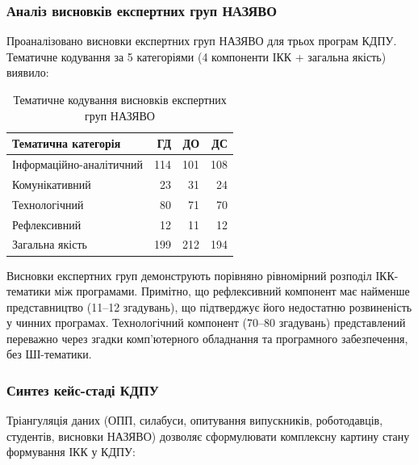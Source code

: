 \subsubsection{Аналіз висновків експертних груп НАЗЯВО}\label{sssec:2.2.6}

Проаналізовано висновки експертних груп НАЗЯВО для трьох програм КДПУ. Тематичне кодування за 5 категоріями (4 компоненти ІКК + загальна якість) виявило:

\begin{table}[htbp]
\centering
\caption{Тематичне кодування висновків експертних груп НАЗЯВО}\label{tab:expert-coding}
\small
\begin{tabularx}{\textwidth}{@{}Xrrr@{}}
\toprule
\textbf{Тематична категорія} & \textbf{ГД} & \textbf{ДО} & \textbf{ДС} \\
\midrule
Інформаційно-аналітичний & 114 & 101 & 108 \\
Комунікативний & 23 & 31 & 24 \\
Технологічний & 80 & 71 & 70 \\
Рефлексивний & 12 & 11 & 12 \\
Загальна якість & 199 & 212 & 194 \\
\bottomrule
\end{tabularx}
\end{table}

Висновки експертних груп демонструють порівняно рівномірний розподіл ІКК-тематики між програмами. Примітно, що рефлексивний компонент має найменше представництво (11--12 згадувань), що підтверджує його недостатню розвиненість у чинних програмах. Технологічний компонент (70--80 згадувань) представлений переважно через згадки комп'ютерного обладнання та програмного забезпечення, без ШІ-тематики.

\subsubsection{Синтез кейс-стаді КДПУ}\label{sssec:2.2.7}

Тріангуляція даних (ОПП, силабуси, опитування випускників, роботодавців, студентів, висновки НАЗЯВО) дозволяє сформулювати комплексну картину стану формування ІКК у КДПУ:

